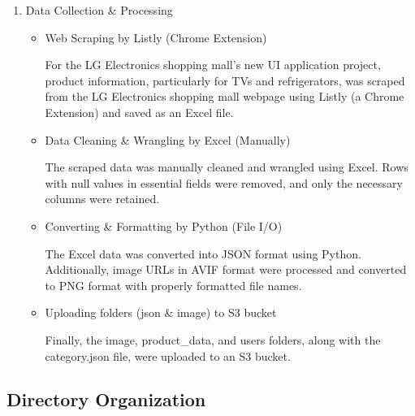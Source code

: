 \documentclass[conference]{IEEEtran}
\begin{document}
\begin{enumerate}
\vspace{2cm}
\item Data Collection \& Processing

\begin{itemize}
\setlength{\parindent}{2ex}

\item Web Scraping by Listly (Chrome Extension)

For the LG Electronics shopping mall's new UI application project, product information, particularly for TVs and refrigerators, was scraped from the LG Electronics shopping mall webpage using Listly (a Chrome Extension) and saved as an Excel file.

\item Data Cleaning \& Wrangling by Excel (Manually)

The scraped data was manually cleaned and wrangled using Excel. Rows with null values in essential fields were removed, and only the necessary columns were retained.

\item Converting \& Formatting by Python (File I/O)

The Excel data was converted into JSON format using Python. Additionally, image URLs in AVIF format were processed and converted to PNG format with properly formatted file names.

\item Uploading folders (json \& image) to S3 bucket

Finally, the image, product\_data, and users folders, along with the category.json file, were uploaded to an S3 bucket.

\end{itemize}

\end{enumerate}

\subsection{Directory Organization}
\end{document}
